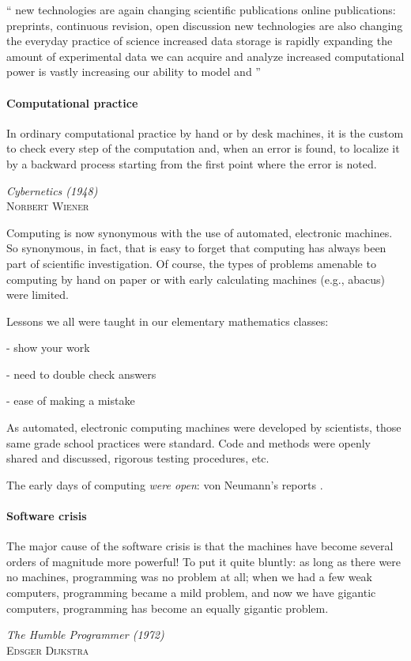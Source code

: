 \documentclass[ChapterTOCs,krantz2]{krantz} %
\begin{document}
``
    new technologies are again changing scientific publications
        online publications: preprints, continuous revision, open discussion
    new technologies are also changing the everyday practice of science
        increased data storage is rapidly expanding the amount of experimental data we can acquire and analyze
        increased computational power is vastly increasing our ability to model and
''



\paragraph{ {\bf Computational practice}}

\setlength{\epigraphrule}{0pt}
\setlength{\epigraphwidth}{.90\textwidth}
\epigraph%
{%
  In ordinary computational practice by hand or by desk machines, it
  is the custom to check every step of the computation and, when an
  error is found, to localize it by a backward process starting from
  the first point where the error is noted.
}%
{\textit{Cybernetics (1948)}\\ \textsc{Norbert Wiener} }

Computing is now synonymous with the use of automated, electronic machines.  So
synonymous, in fact, that is easy to forget that computing has always been part
of scientific investigation. Of course, the types of problems amenable to
computing by hand on paper or with early calculating machines (e.g., abacus)
were limited. 

Lessons we all were taught in our elementary mathematics classes:

- show your work

- need to double check answers

- ease of making a mistake

As automated, electronic computing machines were developed by scientists,
those same grade school practices were standard.  Code and methods were
openly shared and discussed, rigorous testing procedures, etc.

The early days of computing \emph{were open}: von Neumann's reports
\cite{grcar2011john}.

\paragraph{ {\bf Software crisis}}

\setlength{\epigraphrule}{0pt}
\setlength{\epigraphwidth}{.90\textwidth}
\epigraph%
{%
  The major cause of the software crisis is that the machines have become
  several orders of magnitude more powerful! To put it quite bluntly: as long
  as there were no machines, programming was no problem at all; when we had a
  few weak computers, programming became a mild problem, and now we have
  gigantic computers, programming has become an equally gigantic problem.
}%
{\textit{The Humble Programmer (1972)}\\ \textsc{Edsger Dijkstra} }
\end{document}

